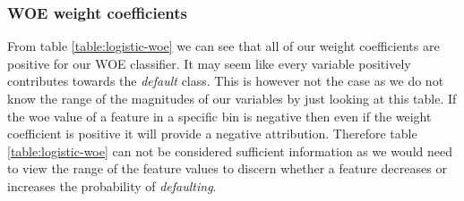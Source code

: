 \subsubsection{WOE weight coefficients}
From table \ref{table:logistic-woe} we can see that all of our weight coefficients are positive for our WOE classifier. It may seem like every variable positively contributes towards the \emph{default} class. This is however not the case as we do not know the range of the magnitudes of our variables by just looking at this table. If the woe value of a feature in a specific bin is negative then even if the weight coefficient is positive it will provide a negative attribution. Therefore table \ref{table:logistic-woe} can not be considered sufficient information as we would need to view the range of the feature values to discern whether a feature decreases or increases the probability of \emph{defaulting}.

